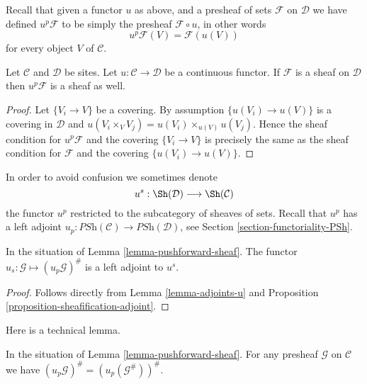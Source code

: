 \noindent
Recall that given a functor $u$ as above, and a presheaf of sets
$\mathcal{F}$ on $\mathcal{D}$ we have defined
$u^p\mathcal{F}$ to be simply the presheaf
$\mathcal{F} \circ u$, in other words
$$
u^p\mathcal{F} (V) = \mathcal{F}(u(V))
$$
for every object $V$ of $\mathcal{C}$.

\begin{lemma}
\label{lemma-pushforward-sheaf}
Let $\mathcal{C}$ and $\mathcal{D}$ be sites.
Let $u : \mathcal{C} \to \mathcal{D}$ be a continuous functor.
If $\mathcal{F}$ is a sheaf on $\mathcal{D}$ then
$u^p\mathcal{F}$ is a sheaf as well.
\end{lemma}

\begin{proof}
Let $\{V_i \to V\}$ be a covering.
By assumption $\{u(V_i) \to u(V)\}$ is a covering
in $\mathcal{D}$ and $u(V_i \times_V V_j) =
u(V_i)\times_{u(V)}u(V_j)$. Hence the sheaf condition for
$u^p\mathcal{F}$ and the covering $\{V_i \to V\}$
is precisely the same as the sheaf condition for $\mathcal{F}$
and the covering $\{u(V_i) \to u(V)\}$.
\end{proof}

\noindent
In order to avoid confusion we sometimes denote
$$
u^s :
\Sh(\mathcal{D})
\longrightarrow
\Sh(\mathcal{C})
$$
the functor $u^p$ restricted to the subcategory of sheaves of sets.
Recall that $u^p$ has a left adjoint
$u_p : \textit{PSh}(\mathcal{C}) \to \textit{PSh}(\mathcal{D})$, see
Section \ref{section-functoriality-PSh}.

\begin{lemma}
\label{lemma-adjoint-sheaves}
In the situation of Lemma \ref{lemma-pushforward-sheaf}.
The functor $u_s : \mathcal{G} \mapsto (u_p \mathcal{G})^\#$
is a left adjoint to $u^s$.
\end{lemma}

\begin{proof}
Follows directly from Lemma \ref{lemma-adjoints-u} and
Proposition \ref{proposition-sheafification-adjoint}.
\end{proof}

\noindent
Here is a technical lemma.

\begin{lemma}
\label{lemma-technical-up}
In the situation of Lemma \ref{lemma-pushforward-sheaf}.
For any presheaf $\mathcal{G}$ on $\mathcal{C}$
we have $(u_p\mathcal{G})^\# = (u_p(\mathcal{G}^\#))^\#$.
\end{lemma}


